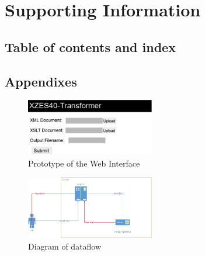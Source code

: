 \section{Supporting Information}

\subsection{Table of contents and index}

\subsection{Appendixes}

% 
% 
% 
% 
% 

        
\begin{figure}[h]
\centering
\caption{Prototype of the Web Interface}
\includegraphics[width=0.5\textwidth]{figures/website-raw}
\end{figure}

\begin{figure}[h]
\centering
\caption{Diagram of dataflow}
\includegraphics[width=0.5\textwidth]{figures/document-flow-digram}
\end{figure}

